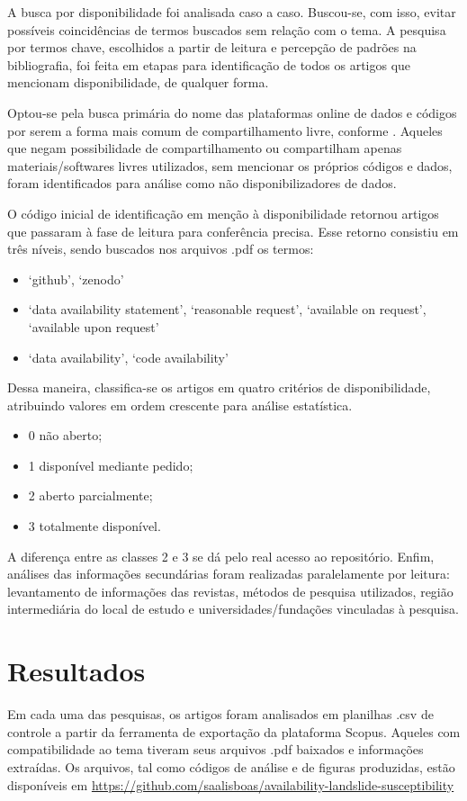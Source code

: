 \documentclass[twocolumn, A4]{article}
\begin{document}
A busca por disponibilidade foi analisada caso a caso. Buscou-se, com isso, evitar possíveis 
coincidências de termos buscados sem relação com o tema. A pesquisa por termos
chave, escolhidos a partir de leitura e percepção de padrões na bibliografia,
foi feita em etapas para identificação de todos os artigos que mencionam 
disponibilidade, de qualquer forma. 

Optou-se pela busca primária do nome das plataformas 
online de dados e códigos por serem a forma mais comum de compartilhamento livre, 
conforme \citet{Tedersoo2021}. Aqueles que negam possibilidade de compartilhamento 
ou compartilham apenas materiais/softwares livres  utilizados, sem mencionar os próprios códigos e dados,
foram identificados para análise como não disponibilizadores de dados. 

O código inicial de identificação em menção à disponibilidade retornou artigos que passaram à fase de leitura para conferência precisa. Esse retorno consistiu em três níveis, sendo buscados nos arquivos .pdf os termos:

\begin{itemize}
    \item `github', `zenodo'
    \item `data availability statement', `reasonable request', `available on request', `available upon request'
    \item `data availability', `code availability'
\end{itemize} 


Dessa maneira, classifica-se os artigos em quatro critérios de disponibilidade, atribuindo valores em ordem crescente para análise estatística.
\begin{itemize}
    \item 0 não aberto; 
    \item 1 disponível mediante pedido;
    \item 2 aberto parcialmente; 
    \item 3 totalmente disponível. 
\end{itemize}

A diferença entre as classes 2 e 3 se dá pelo real acesso ao repositório. Enfim, análises das informações secundárias foram realizadas paralelamente por leitura: levantamento de informações das revistas, métodos de pesquisa utilizados, região intermediária do local de estudo e universidades/fundações vinculadas à pesquisa.

\newpage

\section{Resultados}
Em cada uma das pesquisas, os artigos foram analisados em planilhas .csv de controle a partir da ferramenta de exportação da plataforma Scopus. Aqueles com compatibilidade ao tema tiveram seus arquivos .pdf baixados e informações extraídas. Os arquivos, tal como códigos de análise e de figuras produzidas, estão disponíveis em \url{https://github.com/saalisboas/availability-landslide-susceptibility}
\end{document}
